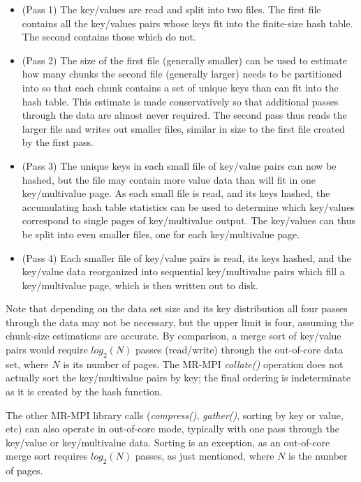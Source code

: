 \begin{itemize}

\item (Pass 1) The key/values are read and split into two files.  The
first file contains all the key/values pairs whose keys fit into the
finite-size hash table.  The second contains those which do not.

\item (Pass 2) The size of the first file (generally smaller) can be
used to estimate how many chunks the second file (generally larger)
needs to be partitioned into so that each chunk contains a set of
unique keys than can fit into the hash table.  This estimate is made
conservatively so that additional passes through the data are almost
never required.  The second pass thus reads the larger file and writes
out smaller files, similar in size to the first file created by the
first pass.

\item (Pass 3) The unique keys in each small file of key/value pairs
can now be hashed, but the file may contain more value data than will
fit in one key/multivalue page.  As each small file is read, and its
keys hashed, the accumulating hash table statistics can be used to
determine which key/values correspond to single pages of
key/multivalue output.  The key/values can thus be split into even
smaller files, one for each key/multivalue page.

\item (Pass 4) Each smaller file of key/value pairs is read, its keys
hashed, and the key/value data reorganized into sequential
key/multivalue pairs which fill a key/multivalue page, which is then
written out to disk.

\end{itemize}

Note that depending on the data set size and its key distribution all
four passes through the data may not be necessary, but the upper limit
is four, assuming the chunk-size estimations are accurate.  By
comparison, a merge sort of key/value pairs would require $log_2(N)$
passes (read/write) through the out-of-core data set, where $N$ is its
number of pages.  The MR-MPI {\it collate()} operation does not
actually sort the key/multivalue pairs by key; the final ordering is
indeterminate as it is created by the hash function.

The other MR-MPI library calls ({\it compress()}, {\it gather()},
sorting by key or value, etc) can also operate in out-of-core mode,
typically with one pass through the key/value or key/multivalue data.
Sorting is an exception, as an out-of-core merge sort requires
$log_2(N)$ passes, as just mentioned, where $N$ is the number of
pages.

